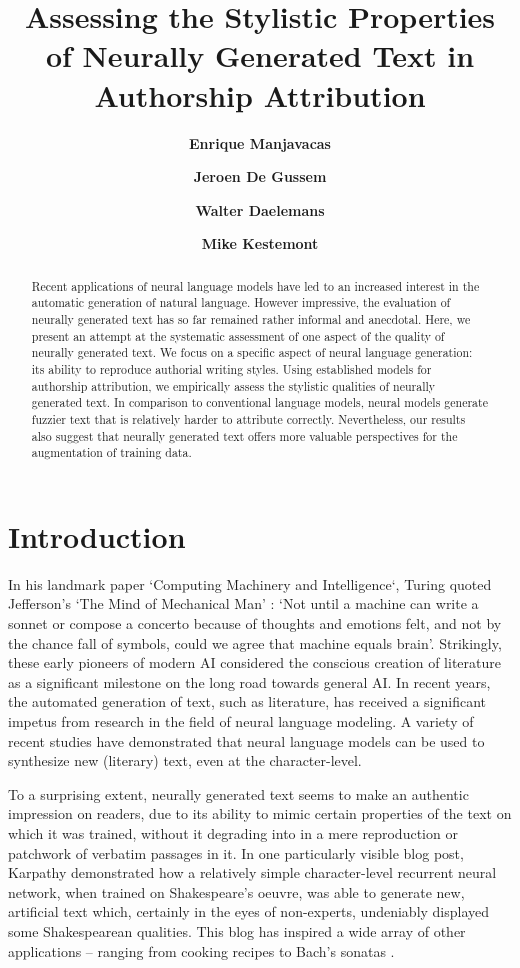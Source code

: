 \documentclass[11pt]{article}
\title{Assessing the Stylistic Properties of Neurally Generated Text in Authorship Attribution\\}
\author[1]{\textbf{Enrique Manjavacas}}
\author[2]{\textbf{Jeroen De Gussem}}
\author[1]{\textbf{Walter Daelemans}}
\author[1]{\textbf{Mike Kestemont}}
\affil[1]{University of Antwerp\\CLiPS\\\tt\{firstname,lastname\}@uantwerpen.be}
\affil[2]{Ghent University\\Department of History\\\tt{jedgusse.degussem@ugent.be}}
\date{}
\begin{document}
\maketitle

\begin{abstract}
Recent applications of neural language models have led to an increased interest in the automatic generation of natural language. However impressive, the evaluation of neurally generated text has so far remained rather informal and anecdotal. Here, we present an attempt at the systematic assessment of one aspect of the quality of neurally generated text. We focus on a specific aspect of neural language generation: its ability to reproduce authorial writing styles. Using established models for authorship attribution, we empirically assess the stylistic qualities of neurally generated text. In comparison to conventional language models, neural models generate fuzzier text that is relatively harder to attribute correctly. Nevertheless, our results also suggest that neurally generated text offers more valuable perspectives for the augmentation of training data.
\end{abstract}

\section{Introduction}
In his landmark paper `Computing Machinery and Intelligence`, Turing
 quoted Jefferson's `The Mind of
Mechanical Man' : `Not until a machine can write a sonnet or compose a concerto because of thoughts and emotions felt, and not by the chance fall of symbols, could we agree that machine equals brain'. Strikingly, these early pioneers of modern AI considered the conscious
creation of literature as a significant milestone on the long road towards general AI. In recent years, the automated generation of text, such as literature, has received a significant impetus from research in the field of neural language modeling. A variety of recent studies have demonstrated that neural language models can be used to synthesize new (literary) text, even at the character-level.

To a surprising extent, neurally generated text seems to make an authentic
impression on readers, due to its ability to mimic 
certain properties of the text on which it was trained, without it 
degrading into in a mere reproduction or patchwork of verbatim passages in
it. In one particularly visible blog post, Karpathy  demonstrated how a relatively simple 
character-level recurrent neural network, when trained on Shakespeare's oeuvre,
was able to generate new, artificial text which, certainly in the eyes
of non-experts, undeniably displayed some Shakespearean qualities. This blog has 
inspired a wide array of other applications -- ranging from cooking recipes \cite{recipe} to Bach's sonatas \cite{bach}.
\end{document}
